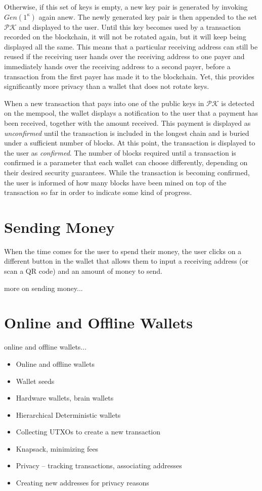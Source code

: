 Otherwise, if this set of keys is empty, a new key pair is generated by invoking $Gen(1^\kappa)$ again anew.
The newly generated key pair is then
appended to the set $\mathcal{PK}$ and displayed to the user. Until this key becomes used by a transaction recorded
on the blockchain, it will not be rotated again, but it will keep being displayed all the same. This means that
a particular receiving address can still be reused if the receiving user hands over the receiving address to one
payer and immediately hands over the receiving address to a second payer, before a transaction from the first payer
has made it to the blockchain. Yet, this provides significantly more privacy than a wallet that does not rotate
keys.

When a new transaction that pays into one of the public keys in $\mathcal{PK}$ is detected on the mempool, the
wallet displays a notification to the user that a payment has been received, together with the amount received.
This payment is displayed as \emph{unconfirmed} until the transaction is included in the longest chain and is
buried under a sufficient number of blocks. At this point, the transaction is displayed to the user as \emph{confirmed}.
The number of blocks required until a transaction is confirmed is a parameter that each wallet can choose differently,
depending on their desired security guarantees. While the transaction is becoming confirmed, the user is informed
of how many blocks have been mined on top of the transaction so far in order to indicate some kind of progress.

\section{Sending Money}

When the time comes for the user to spend their money, the user clicks on a different button in the wallet that
allows them to input a receiving address (or scan a QR code) and an amount of money to send.

{\color{red} more on sending money... }

\section{Online and Offline Wallets}

{\color{red} online and offline wallets...}

{\color{red}
\begin{itemize}
\item Online and offline wallets
\item Wallet seeds
\item Hardware wallets, brain wallets
\item Hierarchical Deterministic wallets
\item Collecting UTXOs to create a new transaction
\item Knapsack, minimizing fees
\item Privacy -- tracking transactions, associating addresses
\item Creating new addresses for privacy reasons
\end{itemize}
}
